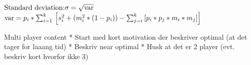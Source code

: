 $\newline\mbox{Standard deviation:} \newline \sigma = \sqrt{\mbox{var}} $
$\newline \mbox{var} = p_i * \sum_{i=1}^{k} \newline\left[s_i^2 + (m_i^2 * (1 - p_i)) - \sum_{j=i}^{k} \left[p_i * p_j * m_i * m_j\right]\right]$\newline



Multi player content
* Start med kort motivation der beskriver optimal (at det tager for laaang tid)
* Beskriv near optimal
* Husk at det er 2 player (evt. beskriv kort hvorfor ikke 3)
